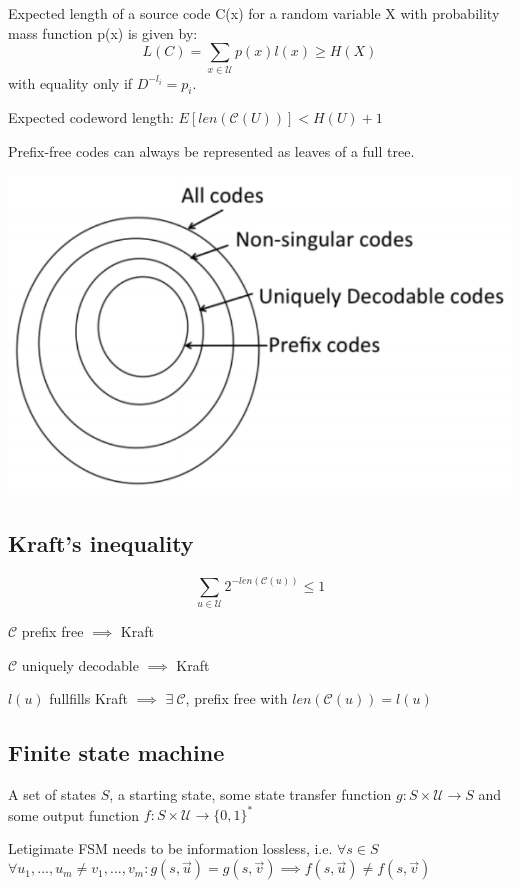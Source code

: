 \documentclass[10pt,a4paper,landscape]{article}
\newcommand{\code}{\mathcal{C}}
\newcommand{\alphabet}{\mathcal{U}}
\begin{document}
\begin{multicols*}{4}
Expected length of a source code C(x) for a random variable X with probability mass function p(x) is given by:
$$L(C) = \sum_{x \in \alphabet} p(x) l(x) \geq H(X)$$
with equality only if $D^{-l_i} = p_i$.

Expected codeword length: $E[len(\code(U))] < H(U) + 1$

Prefix-free codes can always be represented as leaves of a full tree.

\begin{colfig}
	\centering
	\includegraphics[width=\linewidth]{code-classes.png}
\end{colfig}

\subsection{Kraft's inequality}
$$\sum_{u \in \alphabet} 2^{-len(\code(u))} \leq 1$$

$\code$ prefix free $\implies$ Kraft

$\code$ uniquely decodable $\implies$ Kraft

$l(u)$ fullfills Kraft $\implies$ $\exists \ \code$, prefix free with $len(\code(u)) = l(u)$

\subsection{Finite state machine}
A set of states $S$, a starting state, some state transfer function $g: S \times \alphabet \rightarrow S$ and some output function $f: S \times \alphabet \rightarrow \{0,1\}^*$

Letigimate FSM needs to be information lossless, i.e. $\forall s \in S$ $\forall u_1, ..., u_m \neq v_1, ..., v_m: g(s, \vec u) = g(s, \vec v) \implies f(s, \vec u) \neq f(s, \vec v)$


\end{multicols*}
\end{document}
